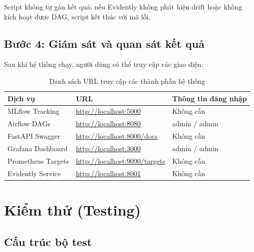 \documentclass[12pt,a4paper]{report}
\begin{document}
Script không tự gán kết quả: nếu Evidently không phát hiện drift hoặc không kích hoạt được DAG, script kết thúc với mã lỗi.

\subsection{Bước 4: Giám sát và quan sát kết quả}

Sau khi hệ thống chạy, người dùng có thể truy cập các giao diện:

\begin{table}[H]
  \centering
  \caption{Danh sách URL truy cập các thành phần hệ thống}
  \label{tab:urls}
  \begin{tabular}{lll}
    \toprule
    \textbf{Dịch vụ} & \textbf{URL} & \textbf{Thông tin đăng nhập} \\
    \midrule
    MLflow Tracking     & \url{http://localhost:5000}       & Không cần \\
    Airflow DAGs        & \url{http://localhost:8080}       & admin / admin \\
    FastAPI Swagger     & \url{http://localhost:8000/docs}  & Không cần \\
    Grafana Dashboard   & \url{http://localhost:3000}       & admin / admin \\
    Prometheus Targets  & \url{http://localhost:9090/targets} & Không cần \\
    Evidently Service   & \url{http://localhost:8001}       & Không cần \\
    \bottomrule
  \end{tabular}
\end{table}

\section{Kiểm thử (Testing)}

\subsection{Cấu trúc bộ test}
\end{document}

